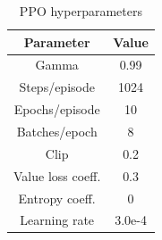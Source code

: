 \documentclass[conference]{IEEEtran}
\begin{document}
\begin{table}[h]
\caption{PPO hyperparameters}
\begin{center}
\label{hyperparams_transposed}
\begin{tabular}{c | c}
Parameter & Value \\
\hline
Gamma & 0.99 \\
Steps/episode & 1024 \\
Epochs/episode & 10 \\
Batches/epoch & 8 \\
Clip & 0.2 \\
Value loss coeff. & 0.3 \\
Entropy coeff. & 0 \\
Learning rate & 3.0e-4 \\
\end{tabular}
\end{center}
\end{table}
\end{document}
